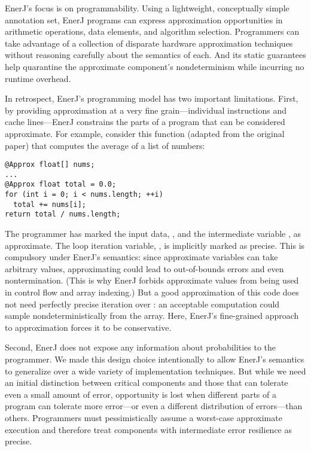 EnerJ's focus is on programmability. Using a lightweight, conceptually simple
annotation set, EnerJ programs can express approximation opportunities in
arithmetic operations, data elements, and algorithm selection. Programmers can
take advantage of a collection of disparate hardware approximation techniques
without reasoning carefully about the semantics of each. And its static
guarantees help quarantine the approximate component's nondeterminism while
incurring no runtime overhead.

In retrospect, EnerJ's programming model has two important limitations. First,
by providing approximation at a very fine grain---individual instructions and
cache lines---EnerJ constrains the parts of a program that can be
considered approximate. For example, consider this function (adapted from the original
paper) that computes the average of a list of numbers:

\begin{lstlisting}
@Approx float[] nums;
...
@Approx float total = 0.0;
for (int i = 0; i < nums.length; ++i)
  total += nums[i];
return total / nums.length;
\end{lstlisting}

The programmer has marked the input data, , and the intermediate
variable , as approximate.
The loop iteration variable, , is implicitly marked as precise. This
is compulsory under EnerJ's semantics: since approximate variables can take
arbitrary values, approximating  could lead to out-of-bounds errors
and even nontermination. (This is why EnerJ forbids approximate values from
being used in control flow and array indexing.) But a good approximation
of this code does not need perfectly precise iteration over : an
acceptable computation could sample nondeterministically from the array.
Here, EnerJ's fine-grained approach to approximation forces it to be
conservative.

Second, EnerJ does not expose any information about probabilities to the
programmer. We made this design choice intentionally to allow EnerJ's
semantics to generalize over a wide variety of implementation techniques. But
while we need an initial distinction between critical components and those
that can tolerate even a small amount of error, opportunity is lost when
different parts of a program can tolerate more error---or even a different
distribution of errors---than others. Programmers must pessimistically
assume a worst-case approximate execution and therefore treat components with
intermediate error resilience as precise.

